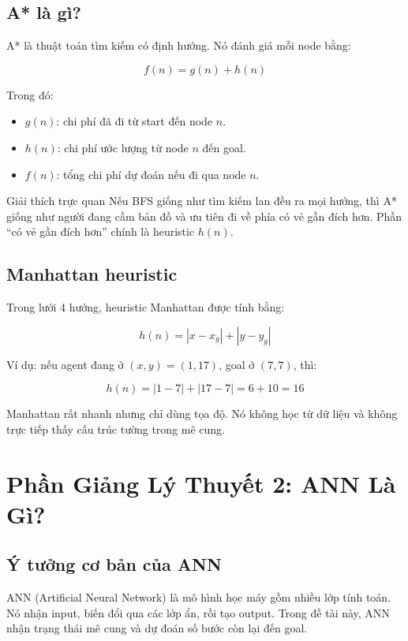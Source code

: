 \documentclass[12pt,a4paper]{article}
\begin{document}
\subsection{A* là gì?}

A* là thuật toán tìm kiếm có định hướng. Nó đánh giá mỗi node bằng:

\[
    f(n) = g(n) + h(n)
\]

Trong đó:

\begin{itemize}
    \item \(g(n)\): chi phí đã đi từ start đến node \(n\).
    \item \(h(n)\): chi phí ước lượng từ node \(n\) đến goal.
    \item \(f(n)\): tổng chi phí dự đoán nếu đi qua node \(n\).
\end{itemize}

\begin{teachbox}{Giải thích trực quan}
Nếu BFS giống như tìm kiếm lan đều ra mọi hướng, thì A* giống như người đang cầm bản đồ và ưu tiên đi về phía có vẻ gần đích hơn. Phần ``có vẻ gần đích hơn'' chính là heuristic \(h(n)\).
\end{teachbox}

\subsection{Manhattan heuristic}

Trong lưới 4 hướng, heuristic Manhattan được tính bằng:

\[
    h(n) = |x - x_g| + |y - y_g|
\]

Ví dụ: nếu agent đang ở \((x,y)=(1,17)\), goal ở \((7,7)\), thì:

\[
    h(n) = |1-7| + |17-7| = 6 + 10 = 16
\]

Manhattan rất nhanh nhưng chỉ dùng tọa độ. Nó không học từ dữ liệu và không trực tiếp thấy cấu trúc tường trong mê cung.

\section{Phần Giảng Lý Thuyết 2: ANN Là Gì?}

\subsection{Ý tưởng cơ bản của ANN}

ANN (Artificial Neural Network) là mô hình học máy gồm nhiều lớp tính toán. Nó nhận input, biến đổi qua các lớp ẩn, rồi tạo output. Trong đề tài này, ANN nhận trạng thái mê cung và dự đoán số bước còn lại đến goal.
\end{document}
